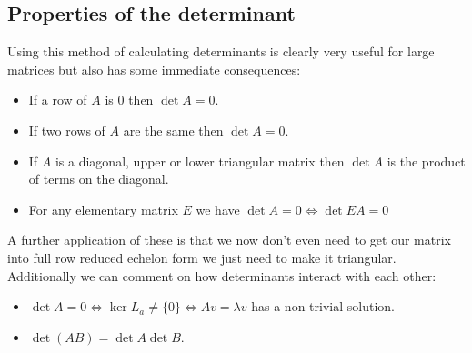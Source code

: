 \documentclass[12pt]{article}
\begin{document}
\subsection*{Properties of the determinant}
Using this method of calculating determinants is clearly very useful for large matrices but also has some immediate consequences:
\begin{itemize}
    \item If a row of \(A\) is 0 then \(\det A=0\).
    \item If two rows of \(A\) are the same then \(\det A=0\).
    \item If \(A\) is a diagonal, upper or lower triangular matrix then \(\det A\) is the product of terms on the diagonal.
    \item For any elementary matrix \(E\) we have \(\det A=0\iff \det EA=0\)
\end{itemize}
A further application of these is that we now don't even need to get our matrix into full row reduced echelon form we just need to make it triangular.
Additionally we can comment on how determinants interact with each other:
\begin{itemize}
    \item \(\det A=0\iff \ker L_a\ne\{0\}\iff Av=\lambda v\) has a non-trivial solution.
    \item \(\det(AB)=\det A\det B\).
\end{itemize}
\end{document}
